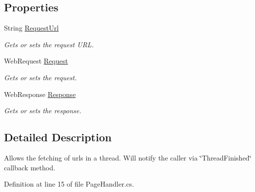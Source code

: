 \subsection*{Properties}
\begin{DoxyCompactItemize}
\item 
String \hyperlink{class_assessment___two___logic_1_1_model_1_1_page_handler_abda47f97c5e49c05084145e753f4db2c}{RequestUrl}
\begin{DoxyCompactList}\small\item\em Gets or sets the request URL. \item\end{DoxyCompactList}\item 
WebRequest \hyperlink{class_assessment___two___logic_1_1_model_1_1_page_handler_a792c28137ad90ab3cec4b3750eb370d3}{Request}
\begin{DoxyCompactList}\small\item\em Gets or sets the request. \item\end{DoxyCompactList}\item 
WebResponse \hyperlink{class_assessment___two___logic_1_1_model_1_1_page_handler_af33fd9af06dc471208ceec9f6a090249}{Response}
\begin{DoxyCompactList}\small\item\em Gets or sets the response. \item\end{DoxyCompactList}\end{DoxyCompactItemize}


\subsection{Detailed Description}
Allows the fetching of urls in a thread. Will notify the caller via \char`\"{}ThreadFinished\char`\"{} callback method. 

Definition at line 15 of file PageHandler.cs.




